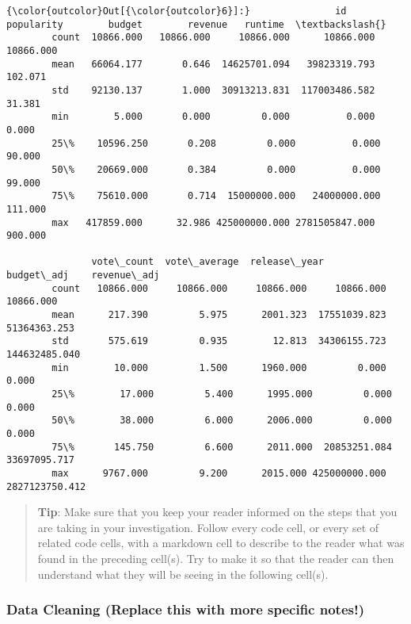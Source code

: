 \documentclass[11pt]{article}
\begin{document}
\begin{Verbatim}[commandchars=\\\{\}]
{\color{outcolor}Out[{\color{outcolor}6}]:}               id  popularity        budget        revenue   runtime  \textbackslash{}
        count  10866.000   10866.000     10866.000      10866.000 10866.000   
        mean   66064.177       0.646  14625701.094   39823319.793   102.071   
        std    92130.137       1.000  30913213.831  117003486.582    31.381   
        min        5.000       0.000         0.000          0.000     0.000   
        25\%    10596.250       0.208         0.000          0.000    90.000   
        50\%    20669.000       0.384         0.000          0.000    99.000   
        75\%    75610.000       0.714  15000000.000   24000000.000   111.000   
        max   417859.000      32.986 425000000.000 2781505847.000   900.000   
        
               vote\_count  vote\_average  release\_year    budget\_adj    revenue\_adj  
        count   10866.000     10866.000     10866.000     10866.000      10866.000  
        mean      217.390         5.975      2001.323  17551039.823   51364363.253  
        std       575.619         0.935        12.813  34306155.723  144632485.040  
        min        10.000         1.500      1960.000         0.000          0.000  
        25\%        17.000         5.400      1995.000         0.000          0.000  
        50\%        38.000         6.000      2006.000         0.000          0.000  
        75\%       145.750         6.600      2011.000  20853251.084   33697095.717  
        max      9767.000         9.200      2015.000 425000000.000 2827123750.412  
\end{Verbatim}
            
    \begin{quote}
\textbf{Tip}: Make sure that you keep your reader informed on the steps
that you are taking in your investigation. Follow every code cell, or
every set of related code cells, with a markdown cell to describe to the
reader what was found in the preceding cell(s). Try to make it so that
the reader can then understand what they will be seeing in the following
cell(s).
\end{quote}

\subsubsection{Data Cleaning (Replace this with more specific
notes!)}\label{data-cleaning-replace-this-with-more-specific-notes}
\end{document}
